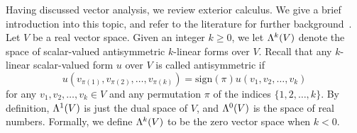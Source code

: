\documentclass[12pt,a4paper]{article}
\begin{document}
%
%



Having discussed vector analysis, we review exterior calculus. 
We give a brief introduction into this topic, and refer to the literature for further background~\cite{...}. 
Let $V$ be a real vector space. 
Given an integer $k \geq 0$, we let $\Lambda^{k}(V)$ denote the space of scalar-valued antisymmetric $k$-linear forms over $V$. 
Recall that any $k$-linear scalar-valued form $u$ over $V$ is called antisymmetric
if 
\[ 
    u( v_{\pi(1)}, v_{\pi(2)}, \ldots, v_{\pi(k)} ) 
    = 
    \text{sign}(\pi) 
    u( v_1, v_2, \ldots, v_k ) 
\]
for any $v_1, v_2, \dots, v_k \in V$ and any permutation $\pi$ of the indices \(\{1, 2, \ldots, k\}\). 
By definition, $\Lambda^{1}(V)$ is just the dual space of $V$, and $\Lambda^{0}(V)$ is the space of real numbers. 
Formally, we define $\Lambda^{k}(V)$ to be the zero vector space when $k < 0$. 
\end{document}
